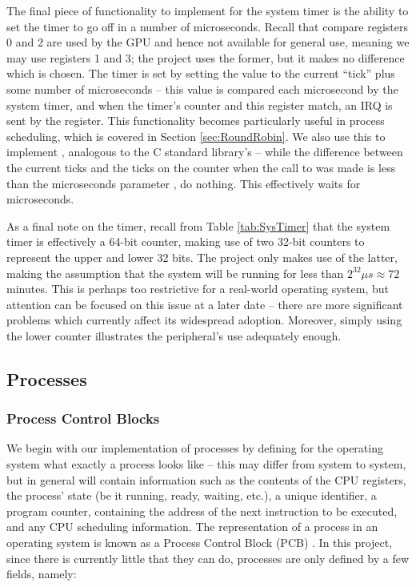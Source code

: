     The final piece of functionality to implement for the system timer is the
    ability to set the timer to go off in a number of microseconds. Recall that
    compare registers 0 and 2 are used by the GPU and hence not available for
    general use, meaning we may use registers 1 and 3; the project uses the
    former, but it makes no difference which is chosen. The timer is set by
    setting the  value to the current ``tick'' plus some number
    of microseconds -- this value is compared each microsecond by the system
    timer, and when the timer's counter and this register match, an IRQ is sent
    by the  register. This functionality becomes particularly
    useful in process scheduling, which is covered in Section
    \ref{sec:RoundRobin}. We also use this to implement ,
    analogous to the C standard library's  -- while the
    difference between the current ticks and the ticks on the counter when the
    call to  was made is less than the microseconds parameter
    , do nothing. This effectively waits for 
    microseconds.

    As a final note on the timer, recall from Table \ref{tab:SysTimer} that the
    system timer is effectively a 64-bit counter, making use of two 32-bit
    counters to represent the upper and lower 32 bits. The project only makes
    use of the latter, making the assumption that the system will be running for
    less than $2^{32} \mu s \approx 72$ minutes. This is perhaps too restrictive
    for a real-world operating system, but attention can be focused on this
    issue at a later date -- there are more significant problems which currently
    affect its widespread adoption. Moreover, simply using the lower counter
    illustrates the peripheral's use adequately enough.

\subsection{Processes}
    \subsubsection{Process Control Blocks}
        We begin with our implementation of processes by defining for the operating
        system what exactly a process looks like -- this may differ from system to
        system, but in general will contain information such as the contents of the
        CPU registers, the process' state (be it running, ready, waiting, etc.), a
        unique identifier, a program counter, containing the address of the next
        instruction to be executed, and any CPU scheduling information. The
        representation of a process in an operating system is known as a Process
        Control Block (PCB) \cite[pg.~105]{DinosaurOS}. In this project, since there
        is currently little that they can do, processes are only defined by a few
        fields, namely:

